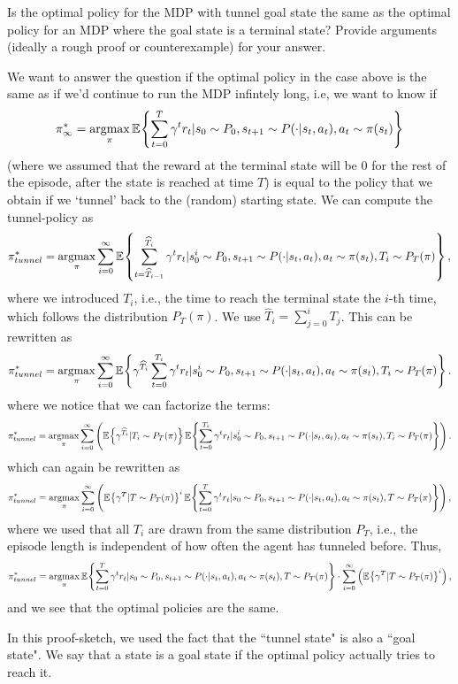 \begin{enumerate}
Is the optimal policy for the MDP with tunnel goal state the same as the optimal policy for an MDP where the goal state is a terminal state? Provide arguments (ideally a rough proof or counterexample) for your answer.

\begin{solution}
We want to answer the question if the optimal policy in the case above is the same as if we'd continue to run the MDP infintely long, i.e, we want to know if
%
    $$\pi^*_{\infty} = \operatorname*{argmax}_\pi \mathbb{E}_{}\!\left\{\sum_{t=0}^T\gamma^tr_t| s_0\sim P_0, s_{t+1}\sim P(\cdot | s_t, a_t), a_t\sim \pi(s_t)\right\}$$
%
    (where we assumed that the reward at the terminal state will be 0 for the rest of the episode, after the state is reached at time $T$) is equal to the policy that we obtain if we `tunnel' back to the (random) starting state.
    We can compute the tunnel-policy as
%
%
    $$\pi^*_{tunnel} = \operatorname*{argmax}_\pi \sum_{i=0}^\infty \mathbb{E}_{}\!\left\{\sum_{t=\widehat T_{i-1}}^{\widehat T_i} \gamma^tr_t| s_0^i\sim P_0, s_{t+1}\sim P(\cdot | s_t, a_t), a_t\sim \pi(s_t), T_i\sim P_T(\pi)\right\},$$
%
    where we introduced $T_i$, i.e., the time to reach the terminal state the $i$-th time, which follows the distribution $P_T(\pi)$. We use $\hat T_i = \sum_{j=0}^i T_j$.
    This can be rewritten as 
    $$\pi^*_{tunnel} = \operatorname*{argmax}_\pi \sum_{i=0}^\infty \mathbb{E}_{}\!\left\{\gamma^{\widehat T_i}\sum_{t=0}^{T_i} \gamma^tr_t| s_0^i\sim P_0, s_{t+1}\sim P(\cdot | s_t, a_t), a_t\sim \pi(s_t), T_i\sim P_T(\pi)\right\}.$$
%
where we notice that we can factorize the terms:
    $$\pi^*_{tunnel} = \operatorname*{argmax}_\pi \sum_{i=0}^\infty \left(\mathbb{E}_{}\!\left\{\gamma^{\widehat T_i}| T_i\sim P_T(\pi)\right\}\mathbb{E}_{}\!\left\{\sum_{t=0}^{T_i} \gamma^tr_t| s_0^i\sim P_0, s_{t+1}\sim P(\cdot | s_t, a_t), a_t\sim \pi(s_t), T_i\sim P_T(\pi)\right\}\right).$$
which can again be rewritten as
    $$\pi^*_{tunnel} = \operatorname*{argmax}_\pi \sum_{i=0}^\infty \left(\mathbb{E}_{}\!\left\{\gamma^T| T\sim P_T(\pi)\right\}^i\mathbb{E}_{}\!\left\{\sum_{t=0}^{T} \gamma^tr_t| s_0\sim P_0, s_{t+1}\sim P(\cdot | s_t, a_t), a_t\sim \pi(s_t), T\sim P_T(\pi)\right\}\right),$$
where we used that all $T_i$ are drawn from the same distribution $P_T$, i.e., the episode length is independent of how often the agent has tunneled before.
Thus,
    $$\pi^*_{tunnel} = \operatorname*{argmax}_\pi \mathbb{E}_{}\!\left\{\sum_{t=0}^{T} \gamma^tr_t| s_0\sim P_0, s_{t+1}\sim P(\cdot | s_t, a_t), a_t\sim \pi(s_t), T\sim P_T(\pi)\right\} \cdot \sum_{i=0}^\infty \left(\mathbb{E}_{}\!\left\{\gamma^T| T\sim P_T(\pi)\right\}^i\right),$$
and we see that the optimal policies are the same.

In this proof-sketch, we used the fact that the ``tunnel state" is also a ``goal state".
We say that a state is a goal state if the optimal policy actually tries to reach it. 


\end{solution}
\end{enumerate}

